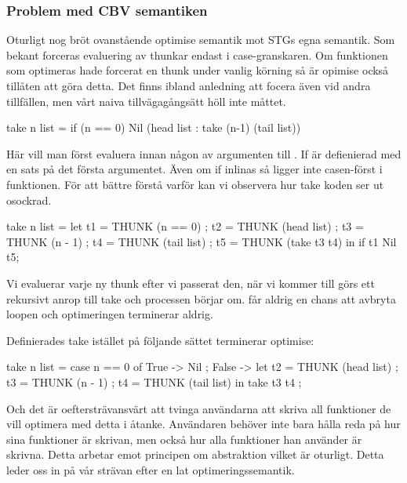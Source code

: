 \documentclass[../Optimise]{subfiles}
\begin{document}

\subsubsection{Problem med CBV semantiken}
\label{CBV:Problem}

Oturligt nog bröt ovanstående optimise semantik mot STGs egna semantik. 
Som bekant forceras evaluering av thunkar endast i case-granskaren. 
Om funktionen som optimeras hade forcerat en thunk under vanlig körning så är
 opimise också tillåten att göra detta. Det finns ibland anledning att focera
 även vid andra tillfällen, men vårt naiva tillvägagångsätt höll inte måttet.

\begin{codeEx}
take n list = if (n == 0) Nil (head list : take (n-1) (tail list))
\end{codeEx}
Här vill man först evaluera  innan någon av argumenten till .
If är defienierad med en  sats på det första argumentet. Även om
if inlinas så ligger inte casen-först i funktionen. För att bättre förstå varför kan vi observera hur take koden ser ut osockrad. 

\begin{codeEx}
take n list = let 
    { t1 = THUNK (n == 0)
    ; t2 = THUNK (head list)
    ; t3 = THUNK (n - 1)
    ; t4 = THUNK (tail list)
    ; t5 = THUNK (take t3 t4)
    } in  if t1 Nil t5;
\end{codeEx}

Vi evaluerar varje ny thunk efter vi passerat den, när vi kommer till 
 görs ett rekursivt anrop till take och processen börjar om.
 får aldrig en chans att avbryta loopen och optimeringen terminerar aldrig.

Definierades take istället på följande sättet terminerar optimise:

\begin{codeEx}
take n list = case n == 0 of
    { True -> Nil
    ; False -> let 
        { t2 = THUNK (head list)
        ; t3 = THUNK (n - 1)
        ; t4 = THUNK (tail list)
        } in  take t3 t4
    };
\end{codeEx}


Och det är oeftersträvansvärt att tvinga användarna att skriva all funktioner
de vill optimera med detta i åtanke. Användaren behöver inte bara hålla reda på 
hur sina funktioner är skrivan, men också hur alla funktioner han använder är skrivna. 
Detta arbetar emot principen om abstraktion vilket är oturligt. Detta leder oss in på vår strävan
efter en lat optimeringssemantik.
\end{document}
